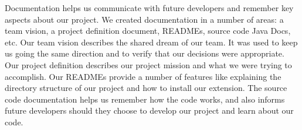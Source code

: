 Documentation helps us communicate with future developers and remember key aspects about our project.
We created documentation in a number of areas: a team vision, a project definition document, READMEs, source code Java Docs, etc.
Our team vision describes the shared dream of our team.
It was used to keep us going the same direction and to verify that our decisions were appropriate.
Our project definition describes our project mission and what we were trying to accomplish.
Our READMEs provide a number of features like explaining the directory structure of our project and how to install our extension.
The source code documentation helps us remember how the code works, and also informs future developers should they choose to develop our project and learn about our code.